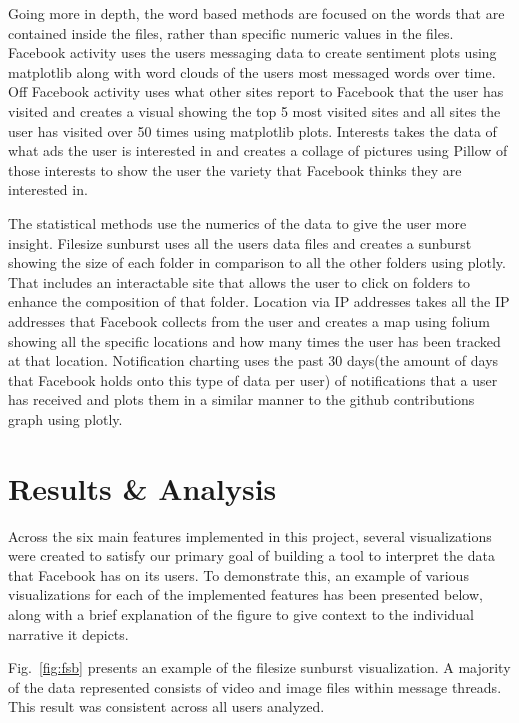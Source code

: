 \documentclass[conference, letterpaper, 11pt]{IEEEtran}
\begin{document}
Going more in depth, the word based methods are focused on the words that are contained inside the files, rather than specific numeric values in the files. Facebook activity uses the users messaging data to create sentiment plots using matplotlib along with word clouds of the users most messaged words over time. Off Facebook activity uses what other sites report to Facebook that the user has visited and creates a visual showing the top 5 most visited sites and all sites the user has visited over 50 times using matplotlib plots. Interests takes the data of what ads the user is interested in and creates a collage of pictures using Pillow of those interests to show the user the variety that Facebook thinks they are interested in.

The statistical methods use the numerics of the data to give the user more insight. Filesize sunburst uses all the users data files and creates a sunburst showing the size of each folder in comparison to all the other folders using plotly. That includes an interactable site that allows the user to click on folders to enhance the composition of that folder. Location via IP addresses takes all the IP addresses that Facebook collects from the user and creates a map using folium showing all the specific locations and how many times the user has been tracked at that location. Notification charting uses the past 30 days(the amount of days that Facebook holds onto this type of data per user) of notifications that a user has received and plots them in a similar manner to the github contributions graph using plotly.

\section{Results \& Analysis} \label{RA}
Across the six main features implemented in this project, several visualizations were created to satisfy our primary goal of building a tool to interpret the data that Facebook has on its users. To demonstrate this, an example of various visualizations for each of the implemented features has been presented below, along with a brief explanation of the figure to give context to the individual narrative it depicts.

Fig.~\ref{fig:fsb} presents an example of the filesize sunburst visualization. A majority of the data represented consists of video and image files within message threads. This result was consistent across all users analyzed.
\end{document}
